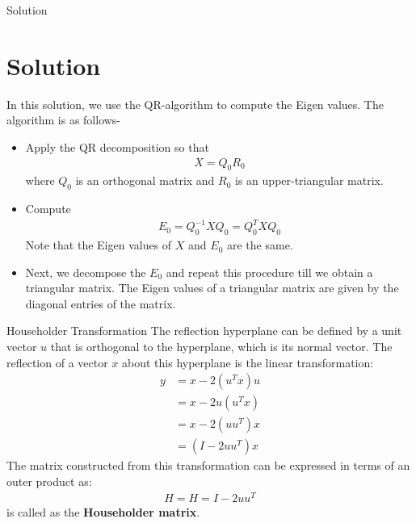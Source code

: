 \begin{frame}{Solution}
    \section{Solution}
    In this solution, we use the QR-algorithm to compute the Eigen values. The algorithm is as follows-
    \begin{itemize}
        \item Apply the QR decomposition so that
                \begin{align*}
                    X = Q_0R_0
                \end{align*}
                where $Q_0$ is an orthogonal matrix and $R_0$ is an upper-triangular matrix.
        \item Compute 
              \begin{align*}
                    E_0 = Q_0^{-1} X Q_0 = Q_0 ^ T X Q_0
                \end{align*} 
                Note that the Eigen values of $X$ and $E_0$ are the same.
        \item Next, we decompose the $E_0$ and repeat this procedure till we obtain a triangular matrix. The Eigen values of a triangular matrix are given by the diagonal entries of the matrix.
    \end{itemize}
\end{frame}

\begin{frame}{Householder Transformation}
    The reflection hyperplane can be defined by a unit vector $u$ that is orthogonal to the hyperplane, which is its normal vector. The reflection of a vector $x$ about this hyperplane is the linear transformation:
    \begin{align*}
        y &= x - 2 (u^T x) u \\
        &= x - 2 u (u ^T x) \\
        &= x - 2 (u u ^T) x \\
        &= (I - 2 u u^T) x
    \end{align*}
    The matrix constructed from this transformation can be expressed in terms of an outer product as:
    \begin{align*}
        H = H=I-2 u u^{T}
    \end{align*}
    is called as the \textbf{Householder matrix}.
\end{frame}

